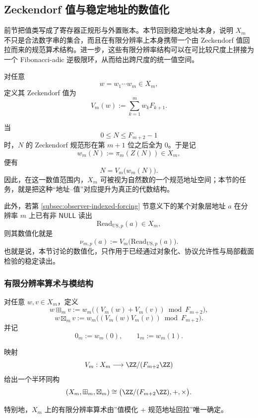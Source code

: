 \subsection{Zeckendorf 值与稳定地址的数值化}\label{subsec:emergent-arithmetic-zeckendorf-value-address}

前节把值类写成了寄存器正规形与外置账本。本节回到稳定地址本身，说明 \(X_m\) 不只是合法数字串的集合，而且在有限分辨率上本身携带一个由 Zeckendorf 值回拉而来的规范算术结构。进一步，这些有限分辨率结构可以在可比较尺度上拼接为一个 Fibonacci-adic 逆极限环，从而给出跨尺度的统一值空间。

对任意
\[
w=w_1\cdots w_m\in X_m,
\]
定义其 Zeckendorf 值为
\[
V_m(w):=\sum_{k=1}^{m} w_k F_{k+1}.
\]

当
\[
0\le N\le F_{m+2}-1
\]
时，\(N\) 的 Zeckendorf 规范形在第 \(m+1\) 位之后全为 \(0\)。于是记
\[
w_m(N):=\pi_m(Z(N))\in X_m,
\]
便有
\[
N=V_m\bigl(w_m(N)\bigr).
\]
因此，在这一数值范围内，\(X_m\) 可被视为自然数的一个规范地址空间；本节的任务，就是把这种“地址--值”对应提升为真正的代数结构。

此外，若第 \ref{subsec:observer-indexed-forcing} 节意义下的某个对象层地址 \(a\) 在分辨率 \(m\) 上已有非 \(\mathsf{NULL}\) 读出
\[
\mathrm{Read}_{\mathrm{US},p}(a)\in X_m,
\]
则其数值化就是
\[
\nu_{m,p}(a):=V_m\bigl(\mathrm{Read}_{\mathrm{US},p}(a)\bigr).
\]
也就是说，本节讨论的数值化，只作用于已经通过对象化、协议允许性与局部截面检验的稳定读出。

\subsubsection{有限分辨率算术与模结构}

\begin{definition}[有限分辨率算术]
对任意 \(w,v\in X_m\)，定义
\[
w\boxplus_m v
:=
w_m\!\bigl((V_m(w)+V_m(v))\bmod F_{m+2}\bigr),
\]
\[
w\boxtimes_m v
:=
w_m\!\bigl((V_m(w)V_m(v))\bmod F_{m+2}\bigr).
\]
并记
\[
0_m:=w_m(0),\qquad 1_m:=w_m(1).
\]
\end{definition}

\begin{theorem}[有限分辨率算术的模结构]\label{thm:finite-resolution-mod}
映射
\[
V_m:X_m\longrightarrow \ZZ/(F_{m+2}\ZZ)
\]
给出一个半环同构
\[
(X_m,\boxplus_m,\boxtimes_m)\cong
\bigl(\ZZ/(F_{m+2}\ZZ),+,\times\bigr).
\]

特别地，\(X_m\) 上的有限分辨率算术由”值模化 + 规范地址回拉”唯一确定。
\end{theorem}

